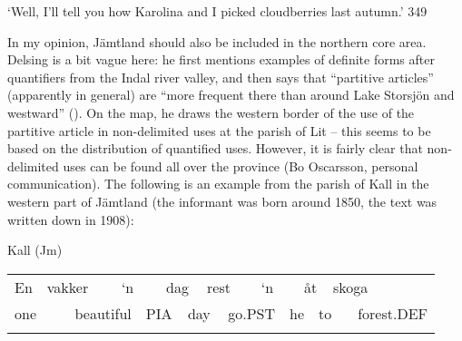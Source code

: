 \begin{styleTranslation}
‘Well, I’ll tell you how Karolina and I picked cloudberries last autumn.’\textsuperscript{ }349

\end{styleTranslation}

\begin{styleBodyTextFirst}
In my opinion, Jämtland should also be included in the northern core area. Delsing is a bit vague here: he first mentions examples of definite forms after quantifiers from the Indal river valley, and then says that “partitive articles” (apparently in general) are “more frequent there than around Lake Storsjön and westward” (\citet[19]{Delsing2003a}). On the map, he draws the western border of the use of the partitive article in non-delimited uses at the parish of Lit – this seems to be based on the distribution of quantified uses. However, it is fairly clear that non-delimited uses can be found all over the province (Bo Oscarsson, personal communication). The following is an example from the parish of Kall in the western part of Jämtland (the informant was born around 1850, the text was written down in 1908):

\end{styleBodyTextFirst}

\begin{listWWNumileveli}
\item 

\begin{styleExample}
Kall (Jm)

\end{styleExample}

\end{listWWNumileveli}

\begin{tabular}{llllllllllllllll}
\lsptoprule
En & \multicolumn{2}{l}{vakker

} & \multicolumn{2}{l}{‘n

} & \multicolumn{2}{l}{dag

} & \multicolumn{2}{l}{rest

} & \multicolumn{2}{l}{‘n

} & \multicolumn{2}{l}{åt

} & \multicolumn{2}{l}{skoga

} & \\
\multicolumn{2}{l}{one

} & \multicolumn{2}{l}{beautiful

} & \multicolumn{2}{l}{PIA

} & \multicolumn{2}{l}{day

} & \multicolumn{2}{l}{go.PST

} & \multicolumn{2}{l}{he

} & \multicolumn{2}{l}{to

} & \multicolumn{2}{l}{forest.DEF

}\\
\lspbottomrule
\end{tabular}

